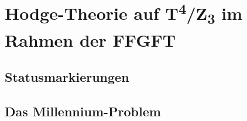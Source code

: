 
\providecommand{\BM}{\textbf{[B]}}
\providecommand{\KM}{\textbf{[K]}}
\providecommand{\SM}{\textbf{[S]}}
\providecommand{\SetzM}{\textbf{[SETZUNG]}}
\providecommand{\QM}{\textbf{[Q]}}
\providecommand{\EM}{\textbf{[E]}}
\providecommand{\XM}{\textbf{[X]}}

\chapter*{Hodge-Theorie auf T\textsuperscript{4}/Z\textsubscript{3} im Rahmen der FFGFT}

\begin{abstract}
Das zweite Millennium-Problem der Mathematik — die Hodge-Vermutung — fragt,
ob jede Hodge-Klasse einer glatten projektiven Varietät eine rationale
Linearkombination algebraischer Zykel ist. Für die Basisgeometrie der FFGFT,
den Orbifold $T^4/\mathbb{Z}_3$, lässt sich diese Frage positiv beantworten:
Der komplexe 2-Torus $T^4$ ist in der Form $E_\omega\times E_\omega$
polarisierbar und damit eine abelsche Fläche, für die die
Hodge-Vermutung bekannt gilt; die neun $\mathbb{Z}_3$-Fixpunkte liefern
algebraische 0-Zykel; und die Sektorpaarung $k \leftrightarrow -k$ (Dok.~343) ist die
Hodge-Symmetrie $H^{p,q} \leftrightarrow H^{q,p}$. Der Galois-Frobenius
$x \mapsto x^3$ auf $GF(27)^*$ ist dagegen nicht mit dem algebraischen
Frobenius auf der étalen Kohomologie identisch: Dessen Eigenwerte auf $H^1$
haben den Betrag $\sqrt{3}$ und sind keine Einheitswurzeln. Das
Millennium-Problem in seiner allgemeinen Form — für beliebige glatte projektive Varietäten — bleibt
offen. Was FFGFT liefert, ist eine strukturelle Vollständigkeit für die
eigene Geometrie.
\end{abstract}

\section*{Statusmarkierungen}


\section{Das Millennium-Problem}

